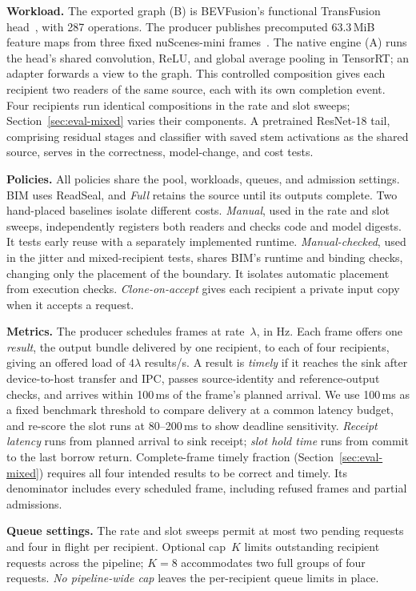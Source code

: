 \documentclass[conference]{IEEEtran}
\newcommand{\MiB}{\,MiB}
\newcommand{\ms}{\,ms}
\begin{document}
\textbf{Workload.} The exported graph (B) is BEVFusion's functional TransFusion head~\cite{bevfusion,transfusion}, with 287 operations. The producer publishes precomputed 63.3\MiB{} feature maps from three fixed nuScenes-mini frames~\cite{nuscenes}. The native engine (A) runs the head's shared convolution, ReLU, and global average pooling in TensorRT; an adapter forwards a view to the graph. This controlled composition gives each recipient two readers of the same source, each with its own completion event. Four recipients run identical compositions in the rate and slot sweeps; Section~\ref{sec:eval-mixed} varies their components. A pretrained ResNet-18 tail, comprising residual stages and classifier with saved stem activations as the shared source, serves in the correctness, model-change, and cost tests.

\textbf{Policies.} All policies share the pool, workloads, queues, and admission settings. BIM uses ReadSeal, and \emph{Full} retains the source until its outputs complete. Two hand-placed baselines isolate different costs. \emph{Manual}, used in the rate and slot sweeps, independently registers both readers and checks code and model digests. It tests early reuse with a separately implemented runtime. \emph{Manual-checked}, used in the jitter and mixed-recipient tests, shares BIM's runtime and binding checks, changing only the placement of the boundary. It isolates automatic placement from execution checks. \emph{Clone-on-accept} gives each recipient a private input copy when it accepts a request.

\textbf{Metrics.} The producer schedules frames at rate~$\lambda$, in Hz. Each frame offers one \emph{result}, the output bundle delivered by one recipient, to each of four recipients, giving an offered load of $4\lambda$ results/s. A result is \emph{timely} if it reaches the sink after device-to-host transfer and IPC, passes source-identity and reference-output checks, and arrives within 100\ms{} of the frame's planned arrival. We use 100\ms{} as a fixed benchmark threshold to compare delivery at a common latency budget, and re-score the slot runs at 80--200\ms{} to show deadline sensitivity. \emph{Receipt latency} runs from planned arrival to sink receipt; \emph{slot hold time} runs from commit to the last borrow return. Complete-frame timely fraction (Section~\ref{sec:eval-mixed}) requires all four intended results to be correct and timely. Its denominator includes every scheduled frame, including refused frames and partial admissions.

\textbf{Queue settings.} The rate and slot sweeps permit at most two pending requests and four in flight per recipient. Optional cap~$K$ limits outstanding recipient requests across the pipeline; $K{=}8$ accommodates two full groups of four requests. \emph{No pipeline-wide cap} leaves the per-recipient queue limits in place.
\end{document}
